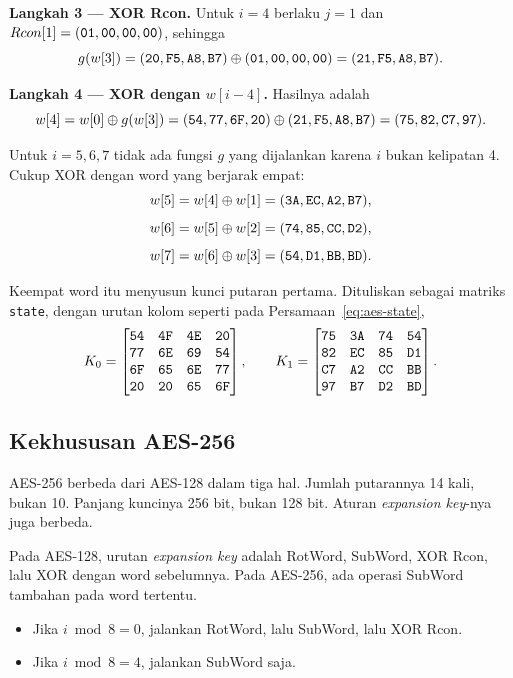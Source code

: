 \textbf{Langkah 3 --- XOR Rcon.} Untuk $i = 4$ berlaku $j = 1$ dan
$Rcon[1] = (\texttt{01},\texttt{00},\texttt{00},\texttt{00})$, sehingga
\[
g(w[3]) = (\texttt{20},\texttt{F5},\texttt{A8},\texttt{B7}) \oplus
(\texttt{01},\texttt{00},\texttt{00},\texttt{00})
= (\texttt{21},\texttt{F5},\texttt{A8},\texttt{B7}).
\]

\textbf{Langkah 4 --- XOR dengan $w[i-4]$.} Hasilnya adalah
\[
w[4] = w[0] \oplus g(w[3])
= (\texttt{54},\texttt{77},\texttt{6F},\texttt{20}) \oplus
(\texttt{21},\texttt{F5},\texttt{A8},\texttt{B7})
= (\texttt{75},\texttt{82},\texttt{C7},\texttt{97}).
\]

Untuk $i = 5, 6, 7$ tidak ada fungsi $g$ yang dijalankan karena $i$ bukan
kelipatan 4. Cukup XOR dengan word yang berjarak empat:
\[
w[5] = w[4] \oplus w[1] = (\texttt{3A},\texttt{EC},\texttt{A2},\texttt{B7}),
\]
\[
w[6] = w[5] \oplus w[2] = (\texttt{74},\texttt{85},\texttt{CC},\texttt{D2}),
\]
\[
w[7] = w[6] \oplus w[3] = (\texttt{54},\texttt{D1},\texttt{BB},\texttt{BD}).
\]

Keempat word itu menyusun kunci putaran pertama. Dituliskan sebagai matriks
\texttt{state}, dengan urutan kolom seperti pada Persamaan~\eqref{eq:aes-state},
\[
K_0 =
\begin{bmatrix}
\texttt{54} & \texttt{4F} & \texttt{4E} & \texttt{20} \\
\texttt{77} & \texttt{6E} & \texttt{69} & \texttt{54} \\
\texttt{6F} & \texttt{65} & \texttt{6E} & \texttt{77} \\
\texttt{20} & \texttt{20} & \texttt{65} & \texttt{6F}
\end{bmatrix},
\qquad
K_1 =
\begin{bmatrix}
\texttt{75} & \texttt{3A} & \texttt{74} & \texttt{54} \\
\texttt{82} & \texttt{EC} & \texttt{85} & \texttt{D1} \\
\texttt{C7} & \texttt{A2} & \texttt{CC} & \texttt{BB} \\
\texttt{97} & \texttt{B7} & \texttt{D2} & \texttt{BD}
\end{bmatrix}.
\]

\subsection{Kekhususan AES-256}

AES-256 berbeda dari AES-128 dalam tiga hal. Jumlah putarannya 14 kali, bukan 10.
Panjang kuncinya 256 bit, bukan 128 bit. Aturan \textit{expansion key}-nya juga
berbeda.

Pada AES-128, urutan \textit{expansion key} adalah RotWord, SubWord, XOR Rcon,
lalu XOR dengan word sebelumnya. Pada AES-256, ada operasi SubWord tambahan pada
word tertentu.
\begin{itemize}
    \item Jika $i \bmod 8 = 0$, jalankan RotWord, lalu SubWord, lalu XOR Rcon.
    \item Jika $i \bmod 8 = 4$, jalankan SubWord saja.
\end{itemize}

